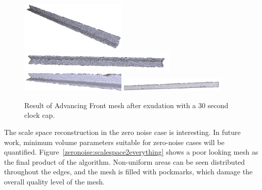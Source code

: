 \documentclass[12pt]{drexelthesis}
\begin{document}
\begin{figure}[!ht]
	\centering
		\includegraphics[width=2in]{simulated-lab-scan/0noise/optimized/advancedfronteverything00.png}
		\includegraphics[width=3in]{simulated-lab-scan/0noise/optimized/advancedfronteverything01.png}
		\includegraphics[width=2in]{simulated-lab-scan/0noise/optimized/advancedfronteverything02.png}
		\includegraphics[width=2in]{simulated-lab-scan/0noise/optimized/advancedfronteverything03.png}
		\caption[Advancing Front mesh after exudation with a 30 second clock cap]{\centering  Result of Advancing Front mesh after exudation with a 30 second clock cap.}
	\label{zeronoise:advancedeverything}
\end{figure}

The scale space reconstruction in the zero noise case is interesting. In future work, minimum volume parameters suitable for zero-noise cases will be quantified. Figure~\ref{zeronoise:scalespace2everything} shows a poor looking mesh as the final product of the algorithm. Non-uniform areas can be seen distributed throughout the edges, and the mesh is filled with pockmarks, which damage the overall quality level of the mesh. 
\end{document}
